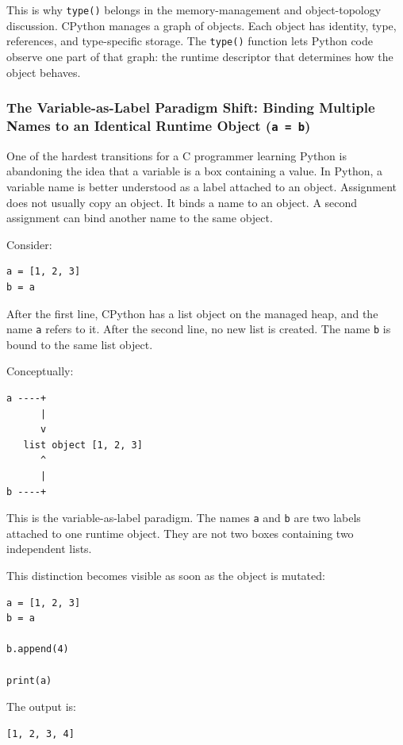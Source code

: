 This is why \texttt{type()} belongs in the memory-management and object-topology discussion. CPython manages a graph of objects. Each object has identity, type, references, and type-specific storage. The \texttt{type()} function lets Python code observe one part of that graph: the runtime descriptor that determines how the object behaves.


\subsubsection{The Variable-as-Label Paradigm Shift: Binding Multiple Names to an Identical Runtime Object (\texttt{a = b})}

One of the hardest transitions for a C programmer learning Python is abandoning the idea that a variable is a box containing a value. In Python, a variable name is better understood as a label attached to an object. Assignment does not usually copy an object. It binds a name to an object. A second assignment can bind another name to the same object.

Consider:

\begin{verbatim}
a = [1, 2, 3]
b = a
\end{verbatim}

After the first line, CPython has a list object on the managed heap, and the name \texttt{a} refers to it. After the second line, no new list is created. The name \texttt{b} is bound to the same list object.

Conceptually:

\begin{verbatim}
a ----+
      |
      v
   list object [1, 2, 3]
      ^
      |
b ----+
\end{verbatim}

This is the variable-as-label paradigm. The names \texttt{a} and \texttt{b} are two labels attached to one runtime object. They are not two boxes containing two independent lists.

This distinction becomes visible as soon as the object is mutated:

\begin{verbatim}
a = [1, 2, 3]
b = a

b.append(4)

print(a)
\end{verbatim}

The output is:

\begin{verbatim}
[1, 2, 3, 4]
\end{verbatim}

